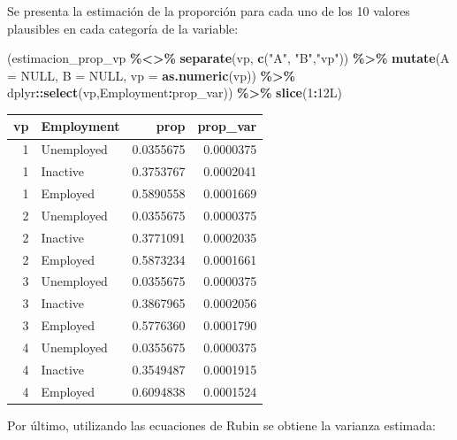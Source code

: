 \documentclass[
  12pt,
]{book}
\newenvironment{Shaded}{\begin{snugshade}}{\end{snugshade}}
\newcommand{\AttributeTok}[1]{\textcolor[rgb]{0.13,0.29,0.53}{#1}}
\newcommand{\ConstantTok}[1]{\textcolor[rgb]{0.56,0.35,0.01}{#1}}
\newcommand{\DataTypeTok}[1]{\textcolor[rgb]{0.13,0.29,0.53}{#1}}
\newcommand{\DecValTok}[1]{\textcolor[rgb]{0.00,0.00,0.81}{#1}}
\newcommand{\FunctionTok}[1]{\textcolor[rgb]{0.13,0.29,0.53}{\textbf{#1}}}
\newcommand{\NormalTok}[1]{#1}
\newcommand{\SpecialCharTok}[1]{\textcolor[rgb]{0.81,0.36,0.00}{\textbf{#1}}}
\newcommand{\StringTok}[1]{\textcolor[rgb]{0.31,0.60,0.02}{#1}}
\begin{document}
Se presenta la estimación de la proporción para cada uno de los 10 valores plausibles en cada categoría de la variable:

\begin{Shaded}
\begin{Highlighting}[]
\NormalTok{(estimacion\_prop\_vp }\SpecialCharTok{\%\textless{}\textgreater{}\%} \FunctionTok{separate}\NormalTok{(vp, }\FunctionTok{c}\NormalTok{(}\StringTok{"A"}\NormalTok{, }\StringTok{"B"}\NormalTok{,}\StringTok{"vp"}\NormalTok{)) }\SpecialCharTok{\%\textgreater{}\%} 
\FunctionTok{mutate}\NormalTok{(}\AttributeTok{A =} \ConstantTok{NULL}\NormalTok{, }\AttributeTok{B =} \ConstantTok{NULL}\NormalTok{, }\AttributeTok{vp =} \FunctionTok{as.numeric}\NormalTok{(vp)) }\SpecialCharTok{\%\textgreater{}\%}
\NormalTok{  dplyr}\SpecialCharTok{::}\FunctionTok{select}\NormalTok{(vp,Employment}\SpecialCharTok{:}\NormalTok{prop\_var)) }\SpecialCharTok{\%\textgreater{}\%} \FunctionTok{slice}\NormalTok{(}\DecValTok{1}\SpecialCharTok{:}\DecValTok{12}\DataTypeTok{L}\NormalTok{)}
\end{Highlighting}
\end{Shaded}

\begin{tabular}{r|l|r|r}
\hline
vp & Employment & prop & prop\_var\\
\hline
1 & Unemployed & 0.0355675 & 0.0000375\\
\hline
1 & Inactive & 0.3753767 & 0.0002041\\
\hline
1 & Employed & 0.5890558 & 0.0001669\\
\hline
2 & Unemployed & 0.0355675 & 0.0000375\\
\hline
2 & Inactive & 0.3771091 & 0.0002035\\
\hline
2 & Employed & 0.5873234 & 0.0001661\\
\hline
3 & Unemployed & 0.0355675 & 0.0000375\\
\hline
3 & Inactive & 0.3867965 & 0.0002056\\
\hline
3 & Employed & 0.5776360 & 0.0001790\\
\hline
4 & Unemployed & 0.0355675 & 0.0000375\\
\hline
4 & Inactive & 0.3549487 & 0.0001915\\
\hline
4 & Employed & 0.6094838 & 0.0001524\\
\hline
\end{tabular}

Por último, utilizando las ecuaciones de Rubin se obtiene la varianza estimada:
\end{document}
